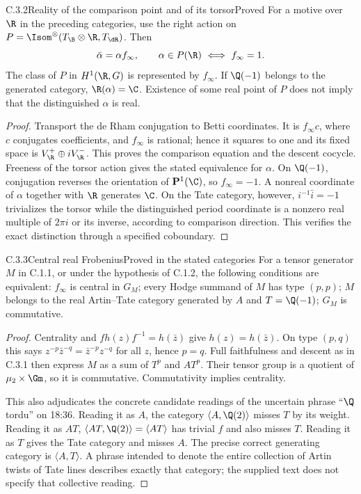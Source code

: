\begin{result}{C.3.2}{Reality of the comparison point and of its torsor}{Proved}
For a motive over $\R$ in the preceding categories, use the right action on $P=\Isom^\otimes(T_{\B}\otimes\R,T_{\dR})$. Then
\[
 \bar\alpha=\alpha f_\infty,
 \qquad
 \alpha\in P(\R)\ \Longleftrightarrow\ f_\infty=1.
\]
The class of $P$ in $H^1(\R,G)$ is represented by $f_\infty$. If $\Q(-1)$ belongs to the generated category, $\R(\alpha)=\C$. Existence of some real point of $P$ does not imply that the distinguished $\alpha$ is real.
\end{result}
\begin{proof}
Transport the de Rham conjugation to Betti coordinates. It is $f_\infty c$, where $c$ conjugates coefficients, and $f_\infty$ is rational; hence it squares to one and its fixed space is $V^+_\R\oplus iV^-_\R$. This proves the comparison equation and the descent cocycle. Freeness of the torsor action gives the stated equivalence for $\alpha$. On $\Q(-1)$, conjugation reverses the orientation of $\mathbf P^1(\C)$, so $f_\infty=-1$. A nonreal coordinate of $\alpha$ together with $\R$ generates $\C$. On the Tate category, however, $i^{-1}\bar i=-1$ trivializes the torsor while the distinguished period coordinate is a nonzero real multiple of $2\pi i$ or its inverse, according to comparison direction. This verifies the exact distinction through a specified coboundary.
\end{proof}

\begin{result}{C.3.3}{Central real Frobenius}{Proved in the stated categories}
For a tensor generator $M$ in C.1.1, or under the hypothesis of C.1.2, the following conditions are equivalent: $f_\infty$ is central in $G_M$; every Hodge summand of $M$ has type $(p,p)$; $M$ belongs to the real Artin--Tate category generated by $A$ and $T=\Q(-1)$; $G_M$ is commutative.
\end{result}
\begin{proof}
Centrality and $f h(z)f^{-1}=h(\bar z)$ give $h(z)=h(\bar z)$. On type $(p,q)$ this says $z^{-p}\bar z^{-q}=\bar z^{-p}z^{-q}$ for all $z$, hence $p=q$. Full faithfulness and descent as in C.3.1 then express $M$ as a sum of $T^p$ and $A T^p$. Their tensor group is a quotient of $\mu_2\times\Gm$, so it is commutative. Commutativity implies centrality.

This also adjudicates the concrete candidate readings of the uncertain phrase ``$\Q$ tordu'' on 18:36. Reading it as $A$, the category $\langle A,\Q(2)\rangle$ misses $T$ by its weight. Reading it as $AT$, $\langle AT,\Q(2)\rangle=\langle AT\rangle$ has trivial $f$ and also misses $T$. Reading it as $T$ gives the Tate category and misses $A$. The precise correct generating category is $\langle A,T\rangle$. A phrase intended to denote the entire collection of Artin twists of Tate lines describes exactly that category; the supplied text does not specify that collective reading.
\end{proof}

